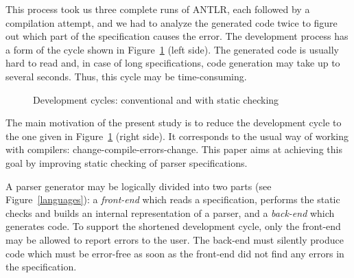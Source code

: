 \documentclass{informat} %
\newcommand{\figref}[1]{Figure~\ref{#1}}
\newcommand{\tool}[1]{\textsc{#1}}
\begin{document}
This process took us three complete runs of \tool{ANTLR}, each followed by a compilation attempt, and we had to analyze the generated code twice to figure out which part of the specification causes the error. The development process has a form of the cycle shown in \figref{cycles} (left side). The generated code is usually hard to read and, in case of long specifications, code generation may take up to several seconds. Thus, this cycle may be time-consuming. 

\begin{figure}[h!]
\centering
{}
\caption{Development cycles: conventional and with static checking}\label{cycles}
\end{figure}

The main motivation of the present study is to reduce the development cycle to the one given in \figref{cycles} (right side).
It corresponds to the usual way of working with compilers: change-compile-errors-change. This paper aims at achieving this goal by improving static checking of parser specifications.

A parser generator may be logically divided into two parts (see \figref{languages}): a \emph{front-end} which reads a specification, performs the static checks and builds an internal representation of a parser, and a \emph{back-end} which generates code. To support the shortened development cycle, only the front-end may be allowed to report errors to the user. The back-end must silently produce code which must be error-free as soon as the front-end did not find any errors in the specification. 
\end{document}
